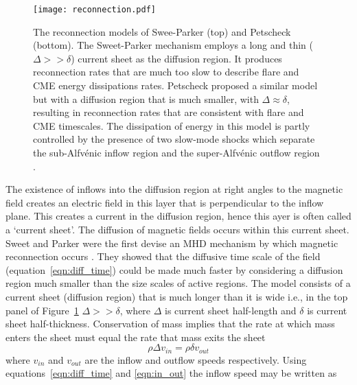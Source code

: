 \begin{figure}[!t]
\begin{center}
\texttt{[image: reconnection.pdf]}
\caption[Sweet-Parker and Petscheck reconnection models]{The reconnection models of Swee-Parker (top) and Petscheck (bottom). The Sweet-Parker mechanism employs a long and thin ($\Delta>>\delta$) current sheet as the diffusion region. It produces reconnection rates that are much too slow to describe flare and CME energy dissipations rates. Petscheck proposed a similar model but with a diffusion region that is much smaller, with $\Delta\approx\delta$, resulting in reconnection rates that are consistent with flare and CME timescales. The dissipation of energy in this model is partly controlled by the presence of two slow-mode shocks which separate the sub-Alfv\'{e}nic inflow region and the super-Alfv\'{e}nic outflow region \citep{asch2004}.}
\label{fig:recconection}
\end{center}
\end{figure}
The existence of inflows into the diffusion region at right angles to the magnetic field creates an electric field in this layer that is perpendicular to the inflow plane. This creates a current in the diffusion region, hence this ayer is often called a `current sheet'. The diffusion of magnetic fields occurs within this current sheet. Sweet and Parker were the first devise an MHD mechanism by which magnetic reconnection occurs \cite{sweet1958, parker1963}. 
They showed that the diffusive time scale of the field (equation~\ref{eqn:diff_time}) could be made much faster by considering a diffusion region much smaller than the size scales of active regions. The model consists of a current sheet (diffusion region) that is much longer than it is wide i.e., in the top panel of Figure~\ref{fig:recconection} $\Delta>>\delta$, where $\Delta$ is current sheet half-length and $\delta$ is current sheet half-thickness. Conservation of mass implies that the rate at which mass enters the sheet must equal the rate that mass exits the sheet
\begin{equation}
\rho \Delta v_{in} = \rho \delta v_{out}
\label{eqn:in_out}
\end{equation}
where $v_{in}$ and $v_{out}$ are the inflow and outflow speeds respectively. Using equations~\ref{eqn:diff_time} and \ref{eqn:in_out} the inflow speed may be written as
